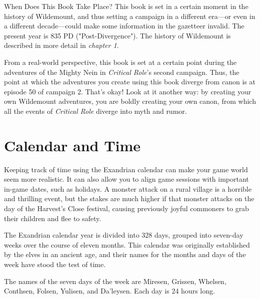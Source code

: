 \documentclass[10pt,a4paper,twoside,bg=print,twocolumn,openany,nodeprecatedcode]{dndbook}
\begin{document}
\begin{DndSidebar}[float=!b]{When Does This Book Take Place?}
This book is set in a certain moment in the history of Wildemount, and thus setting a campaign in a different era—or even in a different decade—could make some information in the gazetteer invalid. The present year is 835 PD ("Post-Divergence"). The history of Wildemount is described in more detail in \textit{chapter 1}.



From a real-world perspective, this book is set at a certain point during the adventures of the Mighty Nein in \textit{Critical Role}'s second campaign. Thus, the point at which the adventures you create using this book diverge from canon is at episode 50 of campaign 2. That's okay! Look at it another way: by creating your own Wildemount adventures, you are boldly creating your own canon, from which all the events of \textit{Critical Role} diverge into myth and rumor.



\end{DndSidebar}

\section{Calendar and Time}
Keeping track of time using the Exandrian calendar can make your game world seem more realistic. It can also allow you to align game sessions with important in-game dates, such as holidays. A monster attack on a rural village is a horrible and thrilling event, but the stakes are much higher if that monster attacks on the day of the Harvest's Close festival, causing previously joyful commoners to grab their children and flee to safety.

The Exandrian calendar year is divided into 328 days, grouped into seven-day weeks over the course of eleven months. This calendar was originally established by the elves in an ancient age, and their names for the months and days of the week have stood the test of time.

The names of the seven days of the week are Miresen, Grissen, Whelsen, Conthsen, Folsen, Yulisen, and Da'leysen. Each day is 24 hours long.
\end{document}
